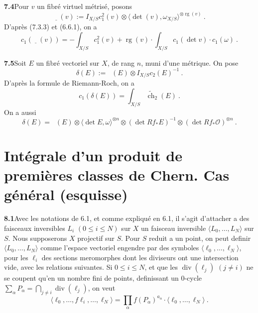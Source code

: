 \documentclass[12pt,a4paper]{article}
\theoremstyle{plain}
\theoremstyle{definition}
\theoremstyle{remark}
\DeclareMathOperator{\rank}{rg}
\DeclareMathOperator{\ch}{ch}
\DeclareMathOperator{\divm}{div}
\newcommand{\calO}{\mathcal{O}}
\DeclareMathOperator{\ICtwo}{IC_2}
\newcommand{\wch}{\widetilde{\ch}}
\begin{document}
\medskip
\noindent\textbf{7.4}\quad Pour $v$ un fibr\'e virtuel m\'etris\'e, posons
\begin{equation}
\label{eq:7.4.1}
\underline{\ICtwo}(v) := I_{X/S} c_1^2(v) \otimes \langle \det(v), \omega_{X/S} \rangle^{\otimes \rank(v)} \ .
\end{equation}
D'apr\`es (7.3.3) et (6.6.1), on a
\begin{equation}
\label{eq:7.4.2}
c_1(\underline{\ICtwo}(v)) = -\int_{X/S} c_1^2(v) + \rank(v) \cdot \int_{X/S} c_1(\det v) \cdot c_1(\omega) \ .
\end{equation}

\medskip
\noindent\textbf{7.5}\quad Soit $E$ un fibr\'e vectoriel sur $X$, de rang $n$, muni d'une m\'etrique. On pose
\begin{equation}
\label{eq:7.5.1}
\delta(E) := \ICtwo(E) \otimes I_{X/S} c_2(E)^{-1} \ .
\end{equation}
D'apr\`es la formule de Riemann-Roch, on a
\begin{equation}
\label{eq:7.5.2}
c_1(\delta(E)) = \int_{X/S} \wch_2(E) \ .
\end{equation}
On a aussi
\begin{equation}
\label{eq:7.5.3}
\delta(E) = \ICtwo(E) \otimes \langle \det E, \omega \rangle^{\otimes n} \otimes (\det Rf_* E)^{-1} \otimes (\det Rf_* \calO)^{\otimes n} \ .
\end{equation}


\section{Int\'egrale d'un produit de premi\`eres classes de Chern. Cas g\'en\'eral (esquisse)}

\noindent\textbf{8.1}\quad Avec les notations de 6.1, et comme expliqu\'e en 6.1, il s'agit d'attacher a des faisceaux inversibles $L_i$ $(0 \leq i \leq N)$ sur $X$ un faisceau inversible $\langle L_0, \ldots, L_N \rangle$ sur $S$. Nous supposerons $X$ projectif sur $S$. Pour $S$ reduit a un point, on peut definir $\langle L_0, \ldots, L_N \rangle$ comme l'espace vectoriel engendre par des symboles $\langle \ell_0, \ldots, \ell_N \rangle$, pour les $\ell_i$ des sections meromorphes dont les diviseurs ont une intersection vide, avec les relations suivantes. Si $0 \leq i \leq N$, et que les $\divm(\ell_j)$ $(j \neq i)$ ne se coupent qu'en un nombre fini de points, definissant un 0-cycle $\sum_\alpha P_\alpha = \bigcap_{j \neq i} \divm(\ell_j)$, on veut
\begin{equation}
\label{eq:8.1.1}
\langle \ell_0, \ldots, f\ell_i, \ldots, \ell_N \rangle = \textstyle\prod_\alpha f(P_\alpha)^{a_\alpha} \cdot \langle \ell_0, \ldots, \ell_N \rangle \ .
\end{equation}
\end{document}
